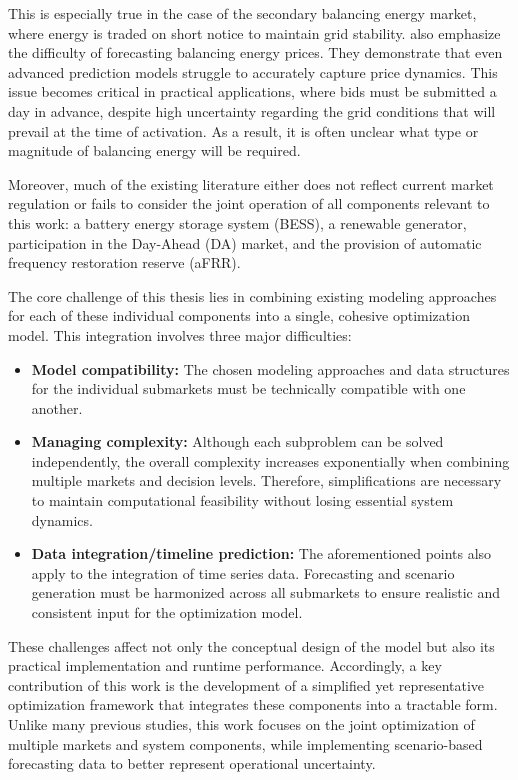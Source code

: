 This is especially true in the case of the secondary balancing energy market,
where energy is traded on short notice to maintain grid stability.
\cite{OConnor.2024} also emphasize the difficulty of forecasting balancing energy prices.
They demonstrate that even advanced prediction models struggle to accurately capture price dynamics.
This issue becomes critical in practical applications, where bids must be submitted a day in advance,
despite high uncertainty regarding the grid conditions that will prevail at the time of activation.
As a result, it is often unclear what type or magnitude of balancing energy will be required.

Moreover, much of the existing literature either does not reflect current market regulation
or fails to consider the joint operation of all components relevant to this work:
a battery energy storage system (BESS), a renewable generator, participation in the Day-Ahead (DA) market,
and the provision of automatic frequency restoration reserve (aFRR).

The core challenge of this thesis lies in combining existing modeling approaches
for each of these individual components into a single, cohesive optimization model.
This integration involves three major difficulties:

\begin{itemize}
	\item \textbf{Model compatibility:} The chosen modeling approaches and data structures
	      for the individual submarkets must be technically compatible with one another.

	\item \textbf{Managing complexity:} Although each subproblem can be solved independently,
	      the overall complexity increases exponentially when combining multiple markets and decision levels.
	      Therefore, simplifications are necessary to maintain computational feasibility
	      without losing essential system dynamics.

	\item \textbf{Data integration/timeline prediction:} The aforementioned points also apply to the integration
	      of time series data. Forecasting and scenario generation must be harmonized across all submarkets
	      to ensure realistic and consistent input for the optimization model.
\end{itemize}

These challenges affect not only the conceptual design of the model but also its practical implementation and runtime performance.
Accordingly, a key contribution of this work is the development of a simplified yet representative optimization framework
that integrates these components into a tractable form.
Unlike many previous studies, this work focuses on the joint optimization of multiple markets and system components,
while implementing scenario-based forecasting data to better represent operational uncertainty.

